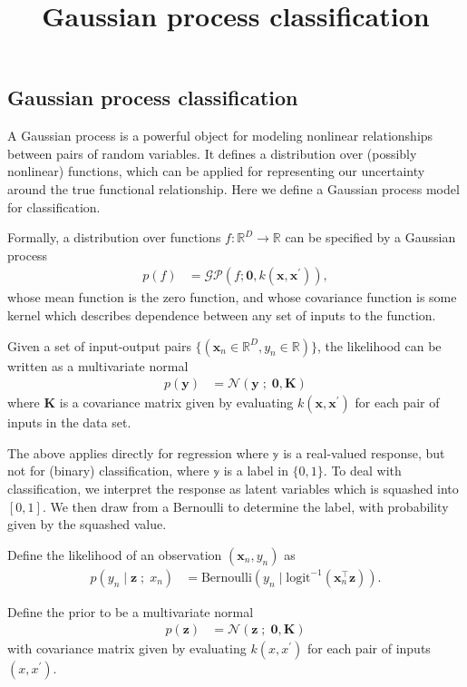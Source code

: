 \title{Gaussian process classification}

\subsection{Gaussian process classification}

A Gaussian process is a powerful object for modeling nonlinear
relationships between pairs of random variables. It defines a distribution over
(possibly nonlinear) functions, which can be applied for representing
our uncertainty around the true functional relationship.
Here we define a Gaussian process model for classification.

Formally, a distribution over functions $f:\mathbb{R}^D\to\mathbb{R}$ can be specified
by a Gaussian process
\begin{align*}
  p(f)
  &=
  \mathcal{GP}(f; \mathbf{0}, k(\mathbf{x}, \mathbf{x}^\prime)),
\end{align*}
whose mean function is the zero function, and whose covariance
function is some kernel which describes dependence between
any set of inputs to the function.

Given a set of input-output pairs
$\{(\mathbf{x}_n\in\mathbb{R}^D,y_n\in\mathbb{R})\}$,
the likelihood can be written as a multivariate normal
\begin{align*}
  p(\mathbf{y})
  &=
  \mathcal{N}(\mathbf{y} \;;\; \mathbf{0}, \mathbf{K})
\end{align*}
where $\mathbf{K}$ is a covariance matrix given by evaluating
$k(\mathbf{x}, \mathbf{x}^\prime)$ for each pair of inputs in the data
set.

The above applies directly for regression where $\mathbb{y}$ is a
real-valued response, but not for (binary) classification, where $\mathbb{y}$
is a label in $\{0,1\}$. To deal with classification, we interpret the
response as latent variables which is squashed into $[0,1]$. We then
draw from a Bernoulli to determine the label, with probability given
by the squashed value.

Define the likelihood of an observation $(\mathbf{x}_n, y_n)$ as
\begin{align*}
  p(y_n \mid \mathbf{z} \;;\; x_n)
  &=
  \text{Bernoulli}(y_n \mid \text{logit}^{-1}(\mathbf{x}_n^\top \mathbf{z})).
\end{align*}

Define the prior to be a multivariate normal
\begin{align*}
  p(\mathbf{z})
  &=
  \mathcal{N}(\mathbf{z} \;;\; \mathbf{0}, \mathbf{K})
\end{align*}
with
covariance matrix given by evaluating $k(x, x^\prime)$ for each pair of inputs
$(x, x^\prime)$.

